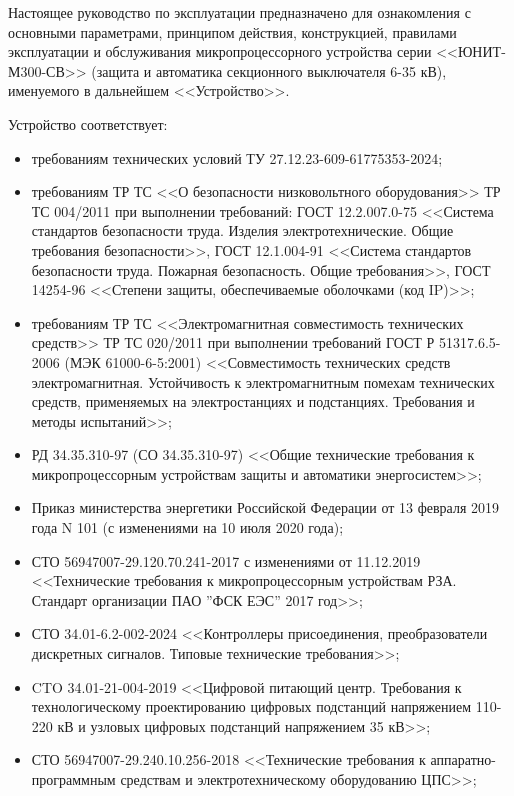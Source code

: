 \par
Настоящее руководство по эксплуатации предназначено для ознакомления с основными параметрами, принципом действия, конструкцией, правилами эксплуатации и обслуживания микропроцессорного устройства серии <<ЮНИТ-М300-СВ>> (защита и автоматика секционного выключателя 6-35 кВ), именуемого в дальнейшем <<Устройство>>.

\par
Устройство соответствует:
\begin{itemize}
\item требованиям технических условий ТУ 27.12.23-609-61775353-2024;
\item требованиям ТР ТС <<О безопасности низковольтного оборудования>> ТР ТС 004/2011 при выполнении требований: ГОСТ 12.2.007.0-75 <<Система стандартов безопасности труда. Изделия электротехнические. Общие требования безопасности>>, ГОСТ 12.1.004-91 <<Система стандартов безопасности труда. Пожарная безопасность. Общие требования>>, ГОСТ 14254-96 <<Степени защиты, обеспечиваемые оболочками (код IP)>>; 
\item требованиям ТР ТС <<Электромагнитная совместимость технических средств>> ТР ТС 020/2011 при выполнении требований ГОСТ Р 51317.6.5-2006 (МЭК 61000-6-5:2001) <<Совместимость технических средств электромагнитная. Устойчивость к электромагнитным помехам технических средств, применяемых на электростанциях и подстанциях. Требования и методы испытаний>>;
\item РД 34.35.310-97 (СО 34.35.310-97) <<Общие технические требования к микропроцессорным устройствам защиты и автоматики энергосистем>>;
\item Приказ министерства энергетики Российской Федерации от 13 февраля 2019 года N 101 (с изменениями на 10 июля 2020 года);
\item СТО 56947007-29.120.70.241-2017 с изменениями от 11.12.2019 <<Технические требования к микропроцессорным устройствам РЗА. Стандарт организации ПАО ''ФСК ЕЭС'' 2017 год>>;
\item СТО 34.01-6.2-002-2024 <<Контроллеры присоединения, преобразователи дискретных сигналов. Типовые технические требования>>;
\item CTO 34.01-21-004-2019 <<Цифровой питающий центр. Требования к технологическому проектированию цифровых подстанций напряжением 110-220 кВ и узловых цифровых подстанций напряжением 35 кВ>>;
\item СТО 56947007-29.240.10.256-2018 <<Технические требования к аппаратно-программным средствам и электротехническому оборудованию ЦПС>>;

\end{itemize}
